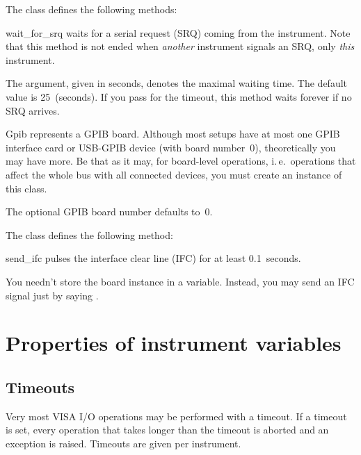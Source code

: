 \documentclass{howto}
\begin{document}
The class  defines the following methods:

\begin{methoddesc}{wait_for_srq}{}
  waits for a serial request (SRQ) coming from the instrument.  Note that this
  method is not ended when \emph{another} instrument signals an SRQ, only
  \emph{this} instrument.
  
  The  argument, given in seconds, denotes the maximal waiting
  time.  The default value is 25~(seconds).  If you pass  for the
  timeout, this method waits forever if no SRQ arrives.
\end{methoddesc}

\bigskip
\begin{classdesc}{Gpib}{}
  represents a GPIB board.  Although most setups have at most one GPIB
  interface card or USB-GPIB device (with board number~0), theoretically you
  may have more.  Be that as it may, for board-level operations, i.\,e.\
  operations that affect the whole bus with all connected devices, you must
  create an instance of this class.

  The optional GPIB board number  defaults to~0.
\end{classdesc}

The class  defines the following method:

\begin{methoddesc}{send_ifc}{}
  pulses the interface clear line (IFC) for at least 0.1~seconds.
\end{methoddesc}

\begin{notice}
You needn't store the board instance in a variable.  Instead, you may send an
IFC signal just by saying \samp{Gpib().send_ifc()}.
\end{notice}


\section{Properties of instrument variables}


\subsection{Timeouts}
\label{sec:timeouts}

Very most VISA I/O operations may be performed with a timeout.  If a timeout is
set, every operation that takes longer than the timeout is aborted and an
exception is raised.  Timeouts are given per instrument.
\end{document}
